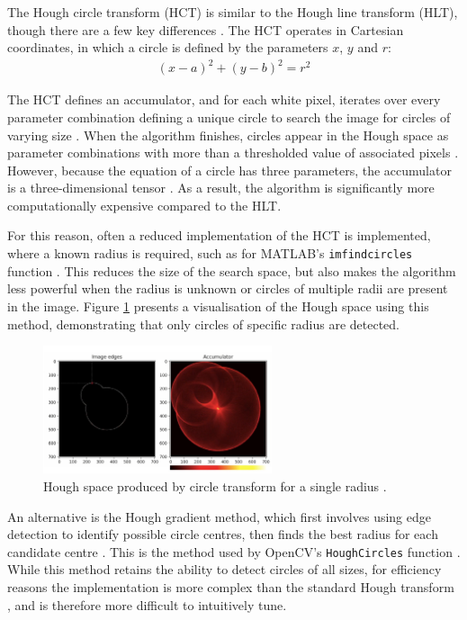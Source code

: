 The Hough circle transform (HCT) is similar to the Hough line transform (HLT), though there are a few key differences \cite{opencv_hct}. The HCT operates in Cartesian coordinates, in which a circle is defined by the parameters $x$, $y$ and $r$:
\begin{align}
  (x - a)^2 + (y - b)^2 = r^2
\end{align}

The HCT defines an accumulator, and for each white pixel, iterates over every parameter combination defining a unique circle to search the image for circles of varying size \cite{korting_hct}. When the algorithm finishes, circles appear in the Hough space as parameter combinations with more than a thresholded value of associated pixels \cite{korting_hct}. However, because the equation of a circle has three parameters, the accumulator is a three-dimensional tensor \cite{wikipedia_hct}. As a result, the algorithm is significantly more computationally expensive compared to the HLT.

For this reason, often a reduced implementation of the HCT is implemented, where a known radius is required, such as for MATLAB's \texttt{imfindcircles} function \cite{mathworks_imfindcircles}. This reduces the size of the search space, but also makes the algorithm less powerful when the radius is unknown or circles of multiple radii are present in the image. Figure \ref{fig:hough_circle} presents a visualisation of the Hough space using this method, demonstrating that only circles of specific radius are detected.

\begin{figure}[ht]
  \centering
  \includegraphics[width=0.6\textwidth]{images/hough_circle.png}
  \caption{Hough space produced by circle transform for a single radius \cite{korting_hct}.}
  \label{fig:hough_circle}
\end{figure}

An alternative is the Hough gradient method, which first involves using edge detection to identify possible circle centres, then finds the best radius for each candidate centre \cite{opencv_hct}. This is the method used by OpenCV's \texttt{HoughCircles} function \cite{opencv_hct}. While this method retains the ability to detect circles of all sizes, for efficiency reasons the implementation is more complex than the standard Hough transform \cite{opencv_hct}, and is therefore more difficult to intuitively tune.

